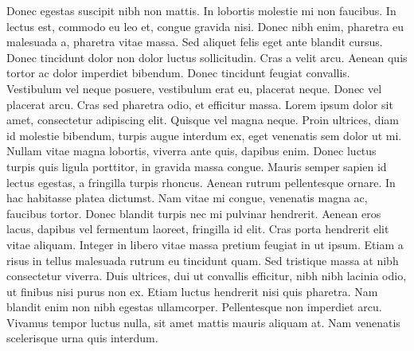\documentclass{novel}
\begin{document}
Donec egestas suscipit nibh non mattis. In lobortis molestie mi non faucibus. In lectus est, commodo eu leo et, congue gravida nisi. Donec nibh enim, pharetra eu malesuada a, pharetra vitae massa. Sed aliquet felis eget ante blandit cursus. Donec tincidunt dolor non dolor luctus sollicitudin. Cras a velit arcu. Aenean quis tortor ac dolor imperdiet bibendum. Donec tincidunt feugiat convallis. Vestibulum vel neque posuere, vestibulum erat eu, placerat neque. Donec vel placerat arcu. Cras sed pharetra odio, et efficitur massa. Lorem ipsum dolor sit amet, consectetur adipiscing elit. Quisque vel magna neque. Proin ultrices, diam id molestie bibendum, turpis augue interdum ex, eget venenatis sem dolor ut mi. Nullam vitae magna lobortis, viverra ante quis, dapibus enim. Donec luctus turpis quis ligula porttitor, in gravida massa congue. Mauris semper sapien id lectus egestas, a fringilla turpis rhoncus. Aenean rutrum pellentesque ornare. In hac habitasse platea dictumst. Nam vitae mi congue, venenatis magna ac, faucibus tortor. Donec blandit turpis nec mi pulvinar hendrerit. Aenean eros lacus, dapibus vel fermentum laoreet, fringilla id elit. Cras porta hendrerit elit vitae aliquam. Integer in libero vitae massa pretium feugiat in ut ipsum. Etiam a risus in tellus malesuada rutrum eu tincidunt quam. Sed tristique massa at nibh consectetur viverra. Duis ultrices, dui ut convallis efficitur, nibh nibh lacinia odio, ut finibus nisi purus non ex. Etiam luctus hendrerit nisi quis pharetra. Nam blandit enim non nibh egestas ullamcorper. Pellentesque non imperdiet arcu. Vivamus tempor luctus nulla, sit amet mattis mauris aliquam at. Nam venenatis scelerisque urna quis interdum.
\end{document}
